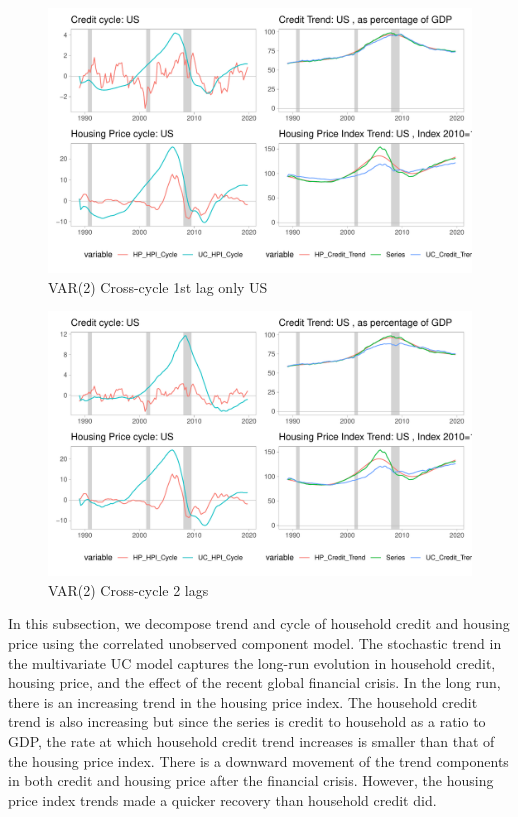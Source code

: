 \documentclass[
  12pt,
]{article}
\begin{document}
\begin{figure}

{\centering \includegraphics[width=0.85\linewidth]{../../Regression/VAR_2_crosscycle_1stlagonly/Output/Graphs/HP_Credit_4graphs_US} 

}

\caption{VAR(2) Cross-cycle 1st lag only US}\label{fig:unnamed-chunk-5}
\end{figure}

\begin{figure}

{\centering \includegraphics[width=0.85\linewidth]{../../Regression/VAR_2_crosscycle/Output/Graphs/HP_Credit_4graphs_US} 

}

\caption{VAR(2) Cross-cycle 2 lags}\label{fig:unnamed-chunk-6}
\end{figure}

        \pagebreak
        In this subsection, we decompose trend and cycle of household credit and housing price using the correlated unobserved component model. The stochastic trend in the multivariate UC model captures the long-run evolution in household credit, housing price, and the effect of the recent global financial crisis. In the long run, there is an increasing trend in the housing price index. The household credit trend is also increasing but since the series is credit to household as a ratio to GDP, the rate at which household credit trend increases is smaller than that of the housing price index. There is a downward movement of the trend components in both credit and housing price after the financial crisis. However, the housing price index trends made a quicker recovery than household credit did. 
        
\end{document}
